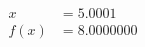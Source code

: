 \documentclass[preview]{standalone}
\begin{document}
\begin{align*}
x &= 5.0001\\f(x) &= 8.0000000
\end{align*}
\end{document}
